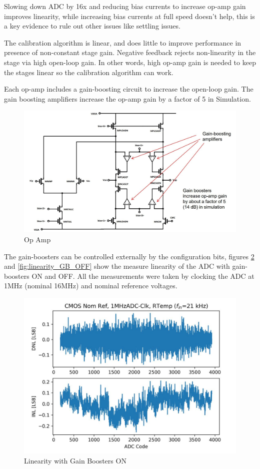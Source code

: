 Slowing down ADC by 16x and reducing bias currents to increase op-amp gain improves linearity, while increasing bias currents at full speed doesn’t help, this is a key evidence to rule out other issues like settling issues.

The calibration algorithm is linear, and does little to improve performance in presence of non-constant stage gain. Negative feedback rejects non-linearity in the stage via high open-loop gain. In other words, high op-amp gain is needed to keep the stages linear so the calibration algorithm can work.

Each op-amp includes a gain-boosting circuit to increase the open-loop gain. The gain boosting amplifiers increase the op-amp gain by a factor of 5 in Simulation. 

\begin{figure}[h!]
\centering
  \includegraphics[width=0.9\linewidth]{figures/prakash_fig/op_amp.JPG}
  \caption{Op Amp}
  \label{fig:op_amp_1}
\end{figure}

The gain-boosters can be controlled externally by the configuration bits, figures \ref{fig:linearity_GB_ON} and \ref{fig:linearity_GB_OFF} show the measure linearity of the ADC with gain-boosters ON and OFF. All the measurements were taken by clocking the ADC at 1MHz (nominal 16MHz) and nominal reference voltages. 

\begin{figure}[h!]
\centering
  \includegraphics[width=0.6\linewidth]{figures/prakash_fig/linearity_GB_ON.JPG}
  \caption{Linearity with Gain Boosters ON}
  \label{fig:linearity_GB_ON}
\end{figure}

